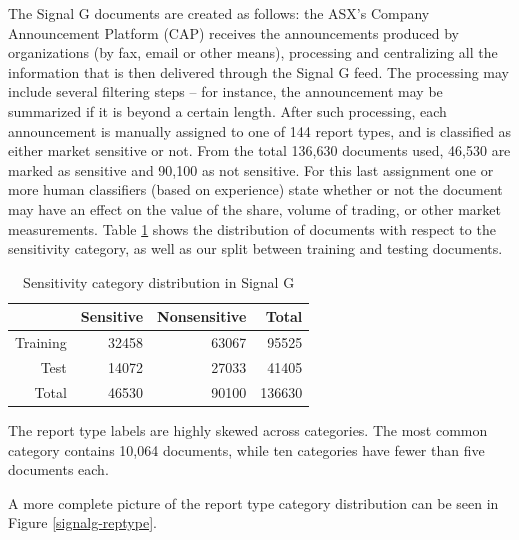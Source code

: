 \documentclass[a4paper,twocolumn]{article}
\begin{document}
The Signal G documents are created as follows: the ASX's Company Announcement Platform (CAP) receives the announcements produced by organizations (by fax, email or other means), processing and centralizing all the information that is then delivered through the Signal G feed. The processing may include several filtering steps -- for instance, the announcement may be summarized if it is beyond a certain length.  After such processing, each announcement is manually assigned to one of 144 report types, and is classified as either market sensitive or not. From the total 136,630 documents used, 46,530 are marked as sensitive and 90,100 as not sensitive. For this last assignment one or more human classifiers (based on experience) state whether or not the document may have an effect on the value of the share, volume of trading, or other market measurements.  Table \ref{signalg-sensitivity} shows the distribution of documents with respect to the sensitivity category, as well as our split between training and testing documents.

\begin{table}
\begin{tabular}{|r|r|r|r|}
\hline
         & Sensitive & Nonsensitive & Total \\
\hline
Training & 32458     & 63067        & 95525 \\
\hline
Test     & 14072     & 27033        & 41405 \\
\hline
Total    & 46530     & 90100        & 136630\\
\hline
\end{tabular}
\caption{Sensitivity category distribution in Signal G}
\label{signalg-sensitivity}
\end{table}

The report type labels are highly skewed across categories.  The most
common category contains 10,064 documents, while ten categories have
fewer than five documents each.

A more complete picture of the report type category distribution can
be seen in Figure \ref{signalg-reptype}.
\end{document}
